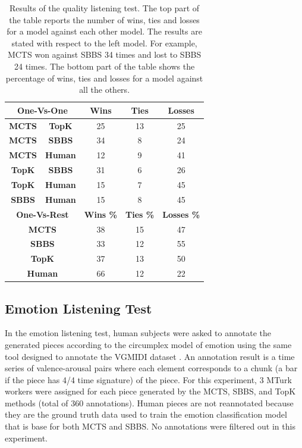 \begin{table}[h]
    \centering
    \begin{tabular}{ccccc}
    \toprule
   \multicolumn{2}{c}{\textbf{One-Vs-One}} & \textbf{Wins} & \textbf{Ties} & \textbf{Losses} \\
    \midrule
    \textbf{MCTS} & \textbf{TopK } & 25 & 13 & 25 \\
    \textbf{MCTS} & \textbf{SBBS } & 34 & 8  & 24 \\
    \textbf{MCTS} & \textbf{Human} & 12 & 9  & 41 \\
    \textbf{TopK} & \textbf{SBBS } & 31 & 6  & 26 \\
    \textbf{TopK} & \textbf{Human} & 15 & 7  & 45 \\
    \textbf{SBBS} & \textbf{Human} & 15 & 8  & 45 \\
    \midrule
    \multicolumn{2}{c}{\textbf{One-Vs-Rest}} & \textbf{Wins \%} & \textbf{Ties \%} & \textbf{Losses \%}  \\
    \midrule
    \multicolumn{2}{c}{\textbf{MCTS}} & 38 & 15 & 47  \\
    \multicolumn{2}{c}{\textbf{SBBS}} & 33 & 12 & 55  \\
    \multicolumn{2}{c}{\textbf{TopK}} & 37 & 13 & 50 \\
    \multicolumn{2}{c}{\textbf{Human}} & 66 & 12 & 22 \\
    \bottomrule
    \end{tabular}
    \caption{Results of the quality listening test. The top part of the table reports the number of wins, ties and losses for a model against each other model. The results are stated with respect to the left model. For example, MCTS won against SBBS 34 times and lost to SBBS 24 times. The bottom part of the table shows the percentage of wins, ties and losses for a model against all the others.}
    \label{tab:quality}
\end{table}

\subsection{Emotion Listening Test}

In the emotion listening test, human subjects were asked to annotate the generated pieces according to the circumplex model of emotion using the same tool designed to annotate the VGMIDI dataset \cite{ferreira_2019}. An annotation result is a time series of valence-arousal pairs where each element corresponds to a chunk (a bar if the piece has 4/4 time signature) of the piece. For this experiment, 3 MTurk workers were assigned for each piece generated by the MCTS, SBBS, and TopK methods (total of 360 annotations). Human pieces are not reannotated because they are the ground truth data used to train the emotion classification model that is base for both MCTS and SBBS. No annotations were filtered out in this experiment.

